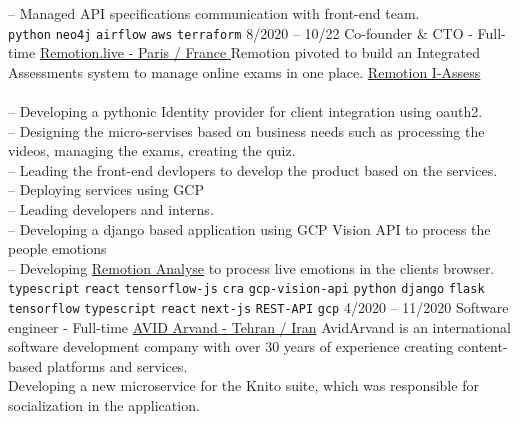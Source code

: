 \begin{entrylist}
{        -- Managed API specifications communication with front-end team. \\
        \texttt{python}\slashsep
        \texttt{neo4j}\slashsep
        \texttt{airflow}\slashsep
        \texttt{aws}\slashsep
        \texttt{terraform}
    }
    \entry
    {8/2020 -- 10/22}
    {Co-founder \& CTO - Full-time}
    {\href{https://remotion.live/}{Remotion.live - Paris / France }}
    {Remotion pivoted to build an Integrated Assessments system to manage online exams in one place.
        \href{https://remotion.live/} {Remotion I-Assess} \\\\
        -- Developing a pythonic Identity provider for client integration using oauth2. \\
        -- Designing the micro-servises based on business needs such as processing the videos, managing the exams, creating the quiz. \\
        -- Leading the front-end devlopers to develop the product based on the services. \\
        -- Deploying services using GCP \\
        -- Leading developers and interns. \\
        -- Developing a django based application using GCP Vision API to process the people emotions \\
        -- Developing \href{https://analyse.remotion.live/} {Remotion Analyse} to process live emotions in the clients browser. \\
        \texttt{typescript}\slashsep
        \texttt{react}\slashsep
        \texttt{tensorflow-js}\slashsep
        \texttt{cra}\slashsep
        \texttt{gcp-vision-api}\slashsep
        \texttt{python}\slashsep
        \texttt{django}\slashsep
        \texttt{flask}\slashsep
        \texttt{tensorflow}\slashsep
        \texttt{typescript}\slashsep
        \texttt{react}\slashsep
        \texttt{next-js}\slashsep
        \texttt{REST-API}\slashsep
        \texttt{gcp}\slashsep
    }
    \entry
    {4/2020 -- 11/2020}
    {Software engineer - Full-time}
    {
        \href{https://www.linkedin.com/company/avid-technology-development/}{AVID Arvand - Tehran / Iran}}
    {
        AvidArvand is an international software development company with over 30 years of experience creating content-based platforms and services. \\
        Developing a new microservice for the Knito suite, which was responsible for socialization in the application.\\
}
\end{entrylist}
